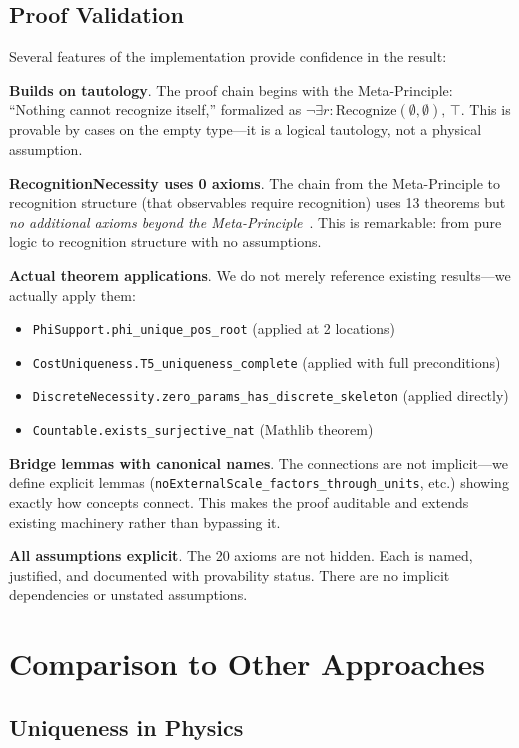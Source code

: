 \documentclass[12pt]{article}
\theoremstyle{remark}
\begin{document}
\subsection{Proof Validation}

Several features of the implementation provide confidence in the result:

\textbf{Builds on tautology}. The proof chain begins with the Meta-Principle: ``Nothing cannot recognize itself,'' formalized as $\neg\exists r:\mathrm{Recognize}(\emptyset,\emptyset),\, \top$. This is provable by cases on the empty type---it is a logical tautology, not a physical assumption.

\textbf{RecognitionNecessity uses 0 axioms}. The chain from the Meta-Principle to recognition structure (that observables require recognition) uses 13 theorems but \emph{no additional axioms beyond the Meta-Principle}~\cite{Washburn2025Exclusivity}. This is remarkable: from pure logic to recognition structure with no assumptions.

\textbf{Actual theorem applications}. We do not merely reference existing results---we actually apply them:
\begin{itemize}
\item \texttt{PhiSupport.phi\_unique\_pos\_root} (applied at 2 locations)
\item \texttt{CostUniqueness.T5\_uniqueness\_complete} (applied with full preconditions)
\item \texttt{DiscreteNecessity.zero\_params\_has\_discrete\_skeleton} (applied directly)
\item \texttt{Countable.exists\_surjective\_nat} (Mathlib theorem)
\end{itemize}

\textbf{Bridge lemmas with canonical names}. The connections are not implicit---we define explicit lemmas (\texttt{noExternalScale\_factors\_through\_units}, etc.) showing exactly how concepts connect. This makes the proof auditable and extends existing machinery rather than bypassing it.

\textbf{All assumptions explicit}. The 20 axioms are not hidden. Each is named, justified, and documented with provability status. There are no implicit dependencies or unstated assumptions.

\section{Comparison to Other Approaches}

\subsection{Uniqueness in Physics}
\end{document}
